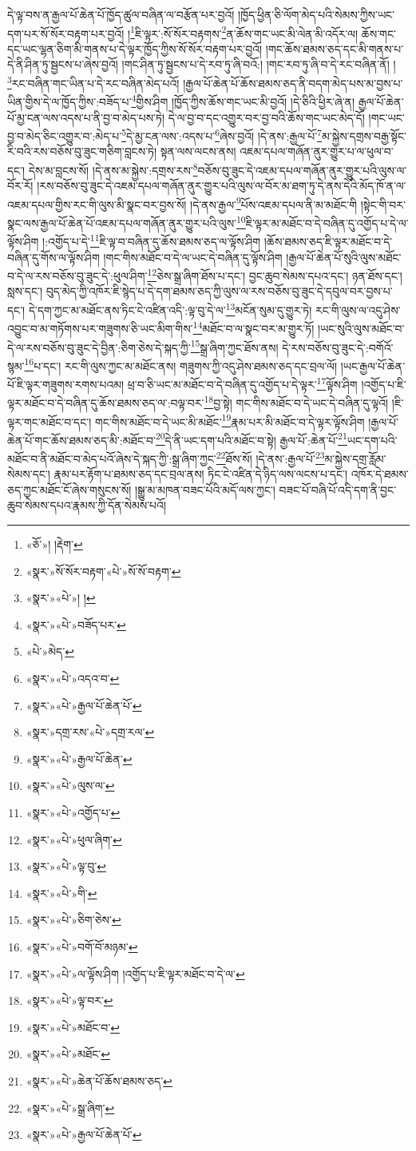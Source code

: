 དེ་ལྟ་བས་ན་རྒྱལ་པོ་ཆེན་པོ་ཁྱོད་ཚུལ་བཞིན་ལ་བརྩོན་པར་བྱའོ། །ཁྱོད་ཕྱིན་ཅི་ལོག་མེད་པའི་སེམས་ཀྱིས་ཡང་དག་པར་སོ་སོར་བརྟག་པར་བྱའོ། །\footnote{«ཅོ་»། །རྡེག་}ཇི་ལྟར་:སོ་སོར་བརྟགས་\footnote{«སྣར་»སོ་སོར་བརྟག་«པེ་»སོ་སོ་བརྟག་}ན་ཆོས་གང་ཡང་མི་ལེན་མི་འདོར་ལ། ཆོས་གང་དང་ཡང་ལྷན་ཅིག་མི་གནས་པ་དེ་ལྟར་ཁྱོད་ཀྱིས་སོ་སོར་བརྟག་པར་བྱའོ། །གང་ཆོས་ཐམས་ཅད་དང་མི་གནས་པ་དེ་ནི་ཤིན་ཏུ་སྦྱངས་པ་ཞེས་བྱའོ། །གང་ཤིན་ཏུ་སྦྱངས་པ་དེ་རབ་ཏུ་ཞི་བའོ:། །གང་རབ་ཏུ་ཞི་བ་དེ་རང་བཞིན་ནོ། །\footnote{«སྣར་»«པེ་»། །}རང་བཞིན་གང་ཡིན་པ་དེ་རང་བཞིན་མེད་པའོ། །རྒྱལ་པོ་ཆེན་པོ་ཆོས་ཐམས་ཅད་ནི་བདག་མེད་པས་མ་བྱས་པ་ཡིན་གྱིས་དེ་ལ་ཁྱོད་ཀྱིས་:བཟོད་པ་\footnote{«སྣར་»«པེ་»བཟོད་པར་}གྱིས་ཤིག །ཁྱོད་ཀྱིས་ཆོས་གང་ཡང་མི་བྱའོ། །དེ་ཅིའི་ཕྱིར་ཞེ་ན། རྒྱལ་པོ་ཆེན་པོ་མྱ་ངན་ལས་འདས་པ་ནི་བྱ་བ་མེད་པས་ཏེ། དེ་ལ་བྱ་བ་དང་འགྱུར་བར་བྱ་བའི་ཆོས་གང་ཡང་མེད་དོ། །གང་ཡང་བྱ་བ་མེད་ཅིང་འགྱུར་བ་:མེད་པ་\footnote{«པེ་»མེད་}དེ་མྱ་ངན་ལས་:འདས་པ་\footnote{«སྣར་»«པེ་»འདའ་བ་}ཞེས་བྱའོ། །དེ་ནས་:རྒྱལ་པོ་\footnote{«སྣར་»«པེ་»རྒྱལ་པོ་ཆེན་པོ་}མ་སྐྱེས་དགྲས་བརྒྱ་སྟོང་རི་བའི་རས་བཅོས་བུ་ཟུང་གཅིག་བླངས་ཏེ། སྟན་ལས་ལངས་ནས། འཇམ་དཔལ་གཞོན་ནུར་གྱུར་པ་ལ་ཕུལ་བ་དང་། དེས་མ་བླངས་སོ། །དེ་ནས་མ་སྐྱེས་:དགྲས་རས་\footnote{«སྣར་»དགྲ་རས་«པེ་»དགྲ་རལ་}བཅོས་བུ་ཟུང་དེ་འཇམ་དཔལ་གཞོན་ནུར་གྱུར་པའི་ལུས་ལ་བོར་རོ། །རས་བཅོས་བུ་ཟུང་དེ་འཇམ་དཔལ་གཞོན་ནུར་གྱུར་པའི་ལུས་ལ་བོར་མ་ཐག་ཏུ་དེ་ནས་དེའི་མོད་ཁོ་ན་ལ་འཇམ་དཔལ་གྱིས་རང་གི་ལུས་མི་སྣང་བར་བྱས་སོ། །དེ་ནས་རྒྱལ་\footnote{«སྣར་»«པེ་»རྒྱལ་པོ་ཆེན་}པོས་འཇམ་དཔལ་ནི་མ་མཐོང་གི །སྟེང་གི་བར་སྣང་ལས་རྒྱལ་པོ་ཆེན་པོ་འཇམ་དཔལ་གཞོན་ནུར་གྱུར་པའི་ལུས་\footnote{«སྣར་»«པེ་»ལུས་ལ་}ཇི་ལྟར་མ་མཐོང་བ་དེ་བཞིན་དུ་འགྱོད་པ་དེ་ལ་ལྟོས་ཤིག །:འགྱོད་པ་དེ་\footnote{«སྣར་»«པེ་»འགྱོད་པ་}ཇི་ལྟ་བ་བཞིན་དུ་ཆོས་ཐམས་ཅད་ལ་ལྟོས་ཤིག །ཆོས་ཐམས་ཅད་ཇི་ལྟར་མཐོང་བ་དེ་བཞིན་དུ་གོས་ལ་ལྟོས་ཤིག །གང་གིས་མཐོང་བ་དེ་ལ་ཡང་དེ་བཞིན་དུ་ལྟོས་ཤིག །རྒྱལ་པོ་ཆེན་པོ་སུའི་ལུས་མཐོང་བ་དེ་ལ་རས་བཅོས་བུ་ཟུང་དེ་:ཕུལ་ཤིག་\footnote{«སྣར་»«པེ་»ཕུལ་ཞིག་}ཅེས་སྒྲ་ཞིག་ཐོས་པ་དང་། བྱང་ཆུབ་སེམས་དཔའ་དང་། ཉན་ཐོས་དང་། སླས་དང་། བུད་མེད་ཀྱི་འཁོར་ཇི་སྙེད་པ་དེ་དག་ཐམས་ཅད་ཀྱི་ལུས་ལ་རས་བཅོས་བུ་ཟུང་དེ་དབུལ་བར་བྱས་པ་དང་། དེ་དག་ཀྱང་མ་མཐོང་ནས་ཏིང་ངེ་འཛིན་འདི་:ལྟ་བུ་དེ་ལ་\footnote{«སྣར་»«པེ་»ལྟ་བུ་}མངོན་སུམ་དུ་གྱུར་ཏེ། རང་གི་ལུས་ལ་འདུ་ཤེས་འབྱུང་བ་མ་གཏོགས་པར་གཟུགས་ཅི་ཡང་མིག་གིས་\footnote{«སྣར་»«པེ་»གི་}མཐོང་བ་ལ་སྣང་བར་མ་གྱུར་ཏོ། །ཡང་སུའི་ལུས་མཐོང་བ་དེ་ལ་རས་བཅོས་བུ་ཟུང་དེ་བྱིན་:ཅིག་ཅེས་དེ་སྐད་ཀྱི་\footnote{«སྣར་»«པེ་»ཅིག་ཅེས་}སྒྲ་ཞིག་ཀྱང་ཐོས་ནས། དེ་རས་བཅོས་བུ་ཟུང་དེ་:བགོའོ་སྙམ་\footnote{«སྣར་»«པེ་»བགོ་བོ་མཉམ་}པ་དང་། རང་གི་ལུས་ཀྱང་མ་མཐོང་ནས། གཟུགས་ཀྱི་འདུ་ཤེས་ཐམས་ཅད་དང་བྲལ་ལོ། །ཡང་རྒྱལ་པོ་ཆེན་པོ་ཇི་ལྟར་གཟུགས་རགས་པའམ། ཕྲ་བ་ཅི་ཡང་མ་མཐོང་བ་དེ་བཞིན་དུ་འགྱོད་པ་དེ་ལྟར་\footnote{«སྣར་»«པེ་»ལ་ལྟོས་ཤིག །འགྱོད་པ་ཇི་ལྟར་མཐོང་བ་དེ་ལ་}ལྟོས་ཤིག །འགྱོད་པ་ཇི་ལྟར་མཐོང་བ་དེ་བཞིན་དུ་ཆོས་ཐམས་ཅད་ལ་:བལྟ་བར་\footnote{«སྣར་»«པེ་»ལྟ་བར་}བྱ་སྟེ། གང་གིས་མཐོང་བ་དེ་ཡང་དེ་བཞིན་དུ་ལྟའོ། །ཇི་ལྟར་གང་མཐོང་བ་དང་། གང་གིས་མཐོང་བ་དེ་ཡང་མི་མཐོང་\footnote{«སྣར་»«པེ་»མཐོང་བ་}རྣམ་པར་མི་མཐོང་བ་དེ་ལྟར་ལྟོས་ཤིག །རྒྱལ་པོ་ཆེན་པོ་གང་ཆོས་ཐམས་ཅད་མི་:མཐོང་བ་\footnote{«སྣར་»«པེ་»མཐོང་}དེ་ནི་ཡང་དག་པའི་མཐོང་བ་སྟེ། རྒྱལ་པོ་:ཆེན་པོ་\footnote{«སྣར་»«པེ་»ཆེན་པོ་ཆོས་ཐམས་ཅད་}ཡང་དག་པའི་མཐོང་བ་ནི་མཐོང་བ་མེད་པའོ་ཞེས་དེ་སྐད་ཀྱི་:སྒྲ་ཞིག་ཀྱང་\footnote{«སྣར་»«པེ་»སྒྲ་ཞིག་}ཐོས་སོ། །དེ་ནས་:རྒྱལ་པོ་\footnote{«སྣར་»«པེ་»རྒྱལ་པོ་ཆེན་པོ་}མ་སྐྱེས་དགྲ་རློམ་སེམས་དང་། རྣམ་པར་རྟོག་པ་ཐམས་ཅད་དང་བྲལ་ནས། ཏིང་ངེ་འཛིན་དེ་ཉིད་ལས་ལངས་པ་དང་། འཁོར་དེ་ཐམས་ཅད་ཀྱང་མཐོང་ངོ་ཞེས་གསུངས་སོ། །སྒྱུ་མ་མཁན་བཟང་པོའི་མདོ་ལས་ཀྱང་། བཟང་པོ་བཞི་པོ་འདི་དག་ནི་བྱང་ཆུབ་སེམས་དཔའ་རྣམས་ཀྱི་དོན་སེམས་པའོ། 